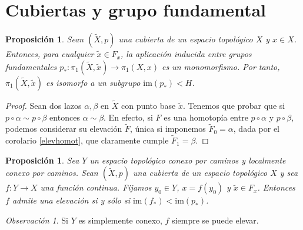 \documentclass[12pt,a4paper]{book}
\newtheorem{prop}[thm]{Proposición}
\theoremstyle{definition} \newtheorem{defn}[thm]{Definición}
\theoremstyle{definition} \newtheorem{ejemplo}[thm]{Ejemplo}
\theoremstyle{definition} \newtheorem{ejercicio}[thm]{Ejercicio}
\theoremstyle{remark} \newtheorem*{obs}{Observación}
\def\gf{\pi_1}
\def\XX{\tilde{X}}
\def\xx{\tilde{x}}
\def\im{\mathrm{im}}
\begin{document}
\section{Cubiertas y grupo fundamental}
\begin{prop}
  Sean $(\XX,p)$ una cubierta de un espacio topológico $X$ y $x\in X$. Entonces, para cualquier $\xx \in F_x$, la aplicación inducida entre grupos fundamentales $p_*:\gf(\XX,\xx)\rightarrow \gf(X,x)$ es un monomorfismo. Por tanto, $\gf(\XX,\xx)$ es isomorfo a un subgrupo $\im(p_*)<H$.
\end{prop}
\begin{proof}
  Sean dos lazos $\alpha, \beta$ en $\XX$ con punto base $\xx$. Tenemos que probar que si $p\circ \alpha \sim p\circ \beta$ entonces $\alpha \sim \beta$. En efecto, si $F$ es una homotopía entre $p\circ \alpha$ y $p\circ \beta$, podemos considerar su elevación $\tilde{F}$, única si imponemos $\tilde{F}_0=\alpha$, dada por el corolario \ref{elevhomot}, que claramente cumple $\tilde{F}_1=\beta$.
\end{proof}
\begin{prop}\label{festrella}
  Sea $Y$ un espacio topológico conexo por caminos y localmente conexo por caminos. Sean $(\XX,p)$ una cubierta de un espacio topológico $X$ y sea $f:Y\rightarrow X$ una función continua. Fijamos $y_0\in Y$, $x=f(y_0)$ y $\xx \in F_x$. Entonces $f$ admite una elevación si y sólo si
 $\im (f_*) < \im (p_*)$.   
\end{prop}

\begin{obs}
  Si $Y$ es simplemente conexo, $f$ siempre se puede elevar.
\end{obs}
\end{document}
